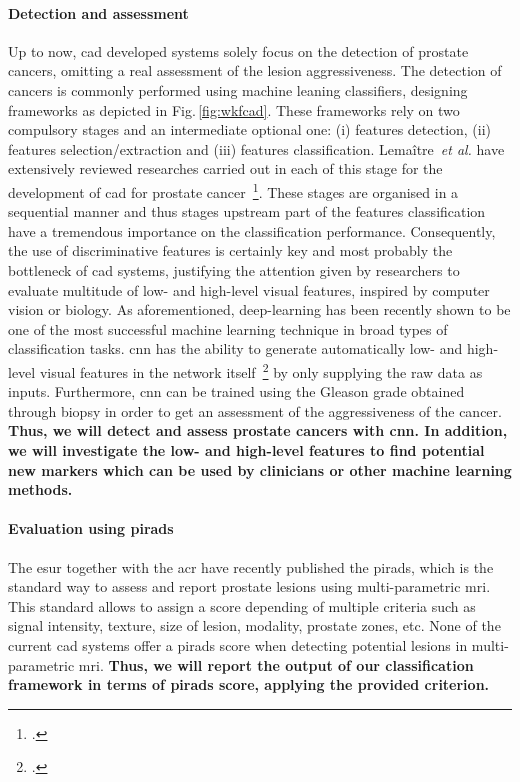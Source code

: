 \paragraph{Detection and assessment}

Up to now, \ac{cad} developed systems solely focus on the detection of prostate cancers, omitting a real assessment of the lesion aggressiveness.
The detection of cancers is commonly performed using machine leaning classifiers, designing frameworks as depicted in Fig.\,\ref{fig:wkfcad}.
These frameworks rely on two compulsory stages and an intermediate optional one: (i) features detection, (ii) features selection/extraction and (iii) features classification.
Lema\^itre~\emph{et al.} have extensively reviewed researches carried out in each of this stage for the development of \ac{cad} for prostate cancer~\footcite{Lemaitre2015}.
These stages are organised in a sequential manner and thus stages upstream part of the features classification have a tremendous importance on the classification performance.
Consequently, the use of discriminative features is certainly key and most probably the bottleneck of \ac{cad} systems, justifying the attention given by researchers to evaluate multitude of low- and high-level visual features, inspired by computer vision or biology.
As aforementioned, deep-learning has been recently shown to be one of the most successful machine learning technique in broad types of classification tasks.
\ac{cnn} has the ability to generate automatically low- and high-level visual features in the network itself~\footcite{Zeiler2013} by only supplying the raw data as inputs.
Furthermore, \ac{cnn} can be trained using the Gleason grade obtained through biopsy in order to get an assessment of the aggressiveness of the cancer.
\textbf{Thus, we will detect and assess prostate cancers with \ac{cnn}. In addition, we will investigate the low- and high-level features to find potential new markers which can be used by clinicians or other machine learning methods.}

\paragraph{Evaluation using \acs*{pirads}}

The \ac{esur} together with the \ac{acr} have recently published the \ac{pirads}, which is the standard way to assess and report prostate lesions using multi-parametric \ac{mri}.
This standard allows to assign a score depending of multiple criteria such as signal intensity, texture, size of lesion, modality, prostate zones, etc.
None of the current \ac{cad} systems offer a \ac{pirads} score when detecting potential lesions in multi-parametric \ac{mri}.
\textbf{Thus, we will report the output of our classification framework in terms of \ac{pirads} score, applying the provided criterion.}

